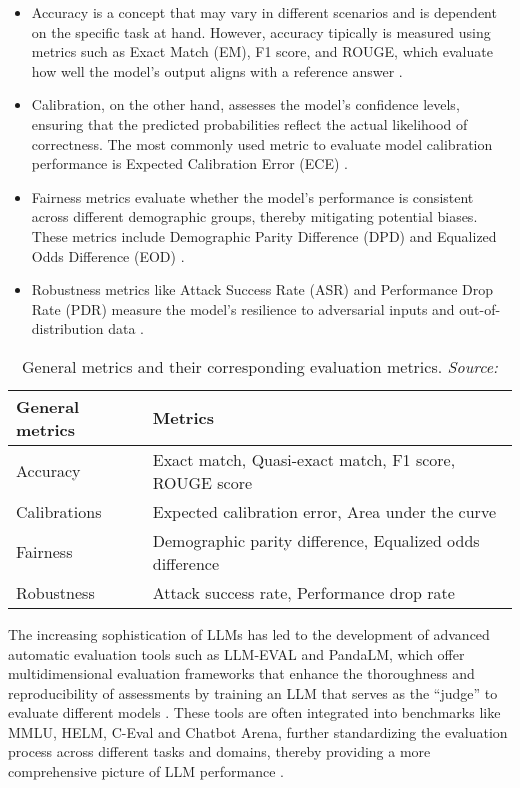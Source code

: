 \begin{itemize}
    \item Accuracy is a concept that may vary in different scenarios and is dependent on the specific task at hand. However, accuracy tipically is measured using metrics such as Exact Match (EM), F1 score, and ROUGE, which evaluate how well the model's output aligns with a reference answer \cite{chang2024survey}.
    \item Calibration, on the other hand, assesses the model’s confidence levels, ensuring that the predicted probabilities reflect the actual likelihood of correctness. The most commonly used metric to evaluate model calibration performance is Expected Calibration Error (ECE) \cite{guo2017calibration}.
    \item Fairness metrics evaluate whether the model's performance is consistent across different demographic groups, thereby mitigating potential biases. These metrics include Demographic Parity Difference (DPD) and Equalized Odds Difference (EOD) \cite{wang2023decodingtrust}.
    \item Robustness metrics like Attack Success Rate (ASR) and Performance Drop Rate (PDR) measure the model's resilience to adversarial inputs and out-of-distribution data \cite{zhu2023promptbench}.
\end{itemize}

\begin{table}[h!]
\centering
\begin{tabular}{|l|l|}
\hline
\textbf{General metrics} & \textbf{Metrics} \\ \hline
Accuracy & Exact match, Quasi-exact match, F1 score, ROUGE score \\ \hline
Calibrations & Expected calibration error, Area under the curve \\ \hline
Fairness & Demographic parity difference, Equalized odds difference \\ \hline
Robustness & Attack success rate, Performance drop rate \\ \hline
\end{tabular}
\caption{General metrics and their corresponding evaluation metrics. \textit{Source:} \cite{chang2024survey}}
\end{table}

The increasing sophistication of LLMs has led to the development of advanced automatic evaluation tools such as LLM-EVAL and PandaLM, which offer multidimensional evaluation frameworks that enhance the thoroughness and reproducibility of assessments by training an LLM that serves as the “judge” to evaluate different models \cite{lin2023llm, wang2023pandalm}. These tools are often integrated into benchmarks like MMLU, HELM, C-Eval and  Chatbot Arena, further standardizing the evaluation process across different tasks and domains, thereby providing a more comprehensive picture of LLM performance \cite{chang2024survey}.

